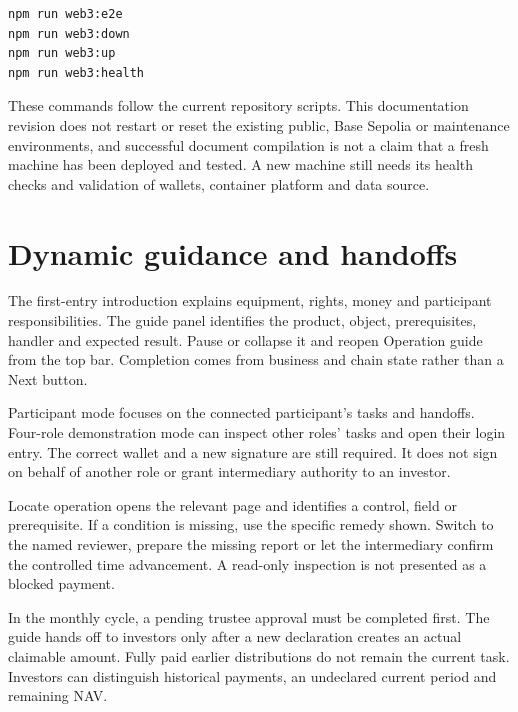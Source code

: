 \documentclass[12pt,a4paper]{article}
\begin{document}
\begin{verbatim}
npm run web3:e2e
npm run web3:down
npm run web3:up
npm run web3:health
\end{verbatim}
These commands follow the current repository scripts. This documentation revision does not restart or reset the existing public, Base Sepolia or maintenance environments, and successful document compilation is not a claim that a fresh machine has been deployed and tested. A new machine still needs its health checks and validation of wallets, container platform and data source.

\clearpage\section{Dynamic guidance and handoffs}
The first-entry introduction explains equipment, rights, money and participant responsibilities. The guide panel identifies the product, object, prerequisites, handler and expected result. Pause or collapse it and reopen Operation guide from the top bar. Completion comes from business and chain state rather than a Next button.

Participant mode focuses on the connected participant’s tasks and handoffs. Four-role demonstration mode can inspect other roles’ tasks and open their login entry. The correct wallet and a new signature are still required. It does not sign on behalf of another role or grant intermediary authority to an investor.

Locate operation opens the relevant page and identifies a control, field or prerequisite. If a condition is missing, use the specific remedy shown. Switch to the named reviewer, prepare the missing report or let the intermediary confirm the controlled time advancement. A read-only inspection is not presented as a blocked payment.

In the monthly cycle, a pending trustee approval must be completed first. The guide hands off to investors only after a new declaration creates an actual claimable amount. Fully paid earlier distributions do not remain the current task. Investors can distinguish historical payments, an undeclared current period and remaining NAV.

\clearpage
\end{document}
